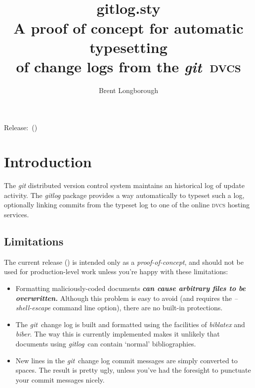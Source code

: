 \documentclass[a4paper,12pt,twoside,openany]{memoir}
\newcommand{\sfit}[1]{\textit{#1}}
\newcommand{\git}{\sfit{git}}
\newcommand{\tpname}{\sfit{gitlog}}
\newcommand{\tpfname}{\textsf{gitlog.sty}}
\begin{document}
\frontmatter
\title{%
	~\\[2\baselineskip]
	\Huge \tpfname\\[2ex]%
	\Large A proof of concept for automatic typesetting \\of change logs from the \git\ \textsc{dvcs}
	}
\author{Brent Longborough}
\date{ }
\maketitle

{\centering
Release:\gitRels\ (\gitAbbrevHash)\\
}
\thispagestyle{empty}
\clearforchapter
\tableofcontents*
\mainmatter
\pagestyle{giruled}
\chapter{Introduction}
The \git{} distributed version control system
maintains an historical log of update activity.
The \tpname{} package provides a way automatically 
to typeset such a log, optionally linking commits 
from the typeset log
to one of the online \textsc{dvcs} hosting services.

\section{Limitations}

The current release (\gitRel) 
is intended only as a \emph{proof-of-concept}, 
and should not be used for production-level work
unless you're happy with these limitations:
\begin{itemize}
\item Formatting maliciously-coded documents 
\textbf{\emph{can cause arbitrary files to be overwritten.}} 
Although this problem is easy to avoid 
(and requires the \sfit{--shell-escape} command line option),
there are no built-in protections.
\item The \git\ change log is built and formatted using the 
facilities of \sfit{biblatex} and \sfit{biber}.
The way this is currently implemented makes it unlikely that 
documents using \tpname\ can contain `normal' bibliographies.
\item New lines in the \git\ change log commit messages are 
simply converted to spaces. 
The result is pretty ugly, 
unless you've had the foresight 
to punctuate your commit messages nicely.
\end{itemize}
\end{document}
